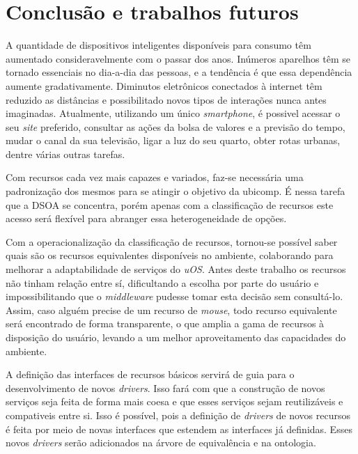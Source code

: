 \chapter{Conclusão e trabalhos futuros}

A quantidade de dispositivos inteligentes disponíveis para consumo têm aumentado consideravelmente com o passar dos anos. Inúmeros aparelhos têm se tornado essenciais no dia-a-dia das pessoas, e a tendência é que essa dependência aumente gradativamente. Diminutos eletrônicos conectados à internet têm reduzido as distâncias e possibilitado novos tipos de interações nunca antes imaginadas. Atualmente, utilizando um único \emph{smartphone}, é possivel acessar o seu \emph{site} preferido, consultar as ações da bolsa de valores e a previsão do tempo, mudar o canal da sua televisão, ligar a luz do seu quarto, obter rotas urbanas, dentre várias outras tarefas.
\begin{comment}
É nesse ambiente cada vez mais ubíquo que a classificação de recursos se insere: ambientes com dispositivos heterogêneos (móveis ou não) interagindo entre si, trocando informações ou utilizando capacidades características de cada aparelho.
\end{comment}

Com recursos cada vez mais capazes e variados, faz-se necessária uma padronização dos mesmos para se atingir o objetivo da ubicomp. É nessa tarefa que a DSOA se concentra, porém apenas com a classificação de recursos este acesso será flexível para abranger essa heterogeneidade de opções.

Com a operacionalização da classificação de recursos, tornou-se possível saber quais são os recursos equivalentes disponíveis no ambiente, colaborando para melhorar a adaptabilidade de serviços do \emph{uOS}. Antes deste trabalho os recursos não tinham relação entre sí, dificultando a escolha por parte do usuário e impossibilitando que o \emph{middleware} pudesse tomar esta decisão sem consultá-lo. Assim, caso alguém precise de um recurso de \emph{mouse}, todo recurso equivalente será encontrado de forma transparente, o que amplia a gama de recursos à disposição do usuário, levando a um melhor aproveitamento das capacidades do ambiente.

A definição das interfaces de recursos básicos servirá de guia para o desenvolvimento de novos \emph{drivers}. Isso fará com que a construção de novos serviços seja feita de forma mais coesa e que esses serviços sejam reutilizáveis e compativeis entre si. Isso é possível, pois a definição de \emph{drivers} de novos recursos é feita por meio de novas interfaces que estendem as interfaces já definidas. Esses novos \emph{drivers} serão adicionados na árvore de equivalência e na ontologia.

